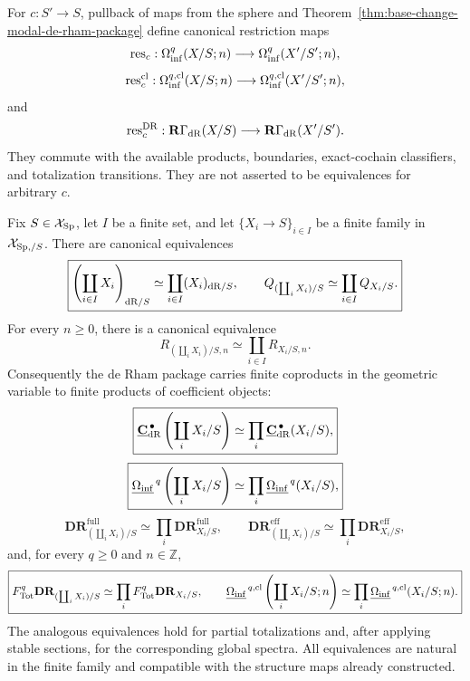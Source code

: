 \begin{construction}
\label{constr:global-form-base-change-restriction}
For \(c:S'\to S\), pullback of maps from the sphere and
Theorem~\ref{thm:base-change-modal-de-rham-package} define canonical restriction maps
\[
    \operatorname{res}_c:
    \Omega_{\mathrm{inf}}^q(X/S;n)
    \longrightarrow
    \Omega_{\mathrm{inf}}^q(X'/S';n),
\]
\[
    \operatorname{res}_c^{\mathrm{cl}}:
    \Omega_{\mathrm{inf}}^{q,\mathrm{cl}}(X/S;n)
    \longrightarrow
    \Omega_{\mathrm{inf}}^{q,\mathrm{cl}}(X'/S';n),
\]
and
\[
    \operatorname{res}_c^{\operatorname{DR}}:
    \mathbf R\Gamma_{\mathrm{dR}}(X/S)
    \longrightarrow
    \mathbf R\Gamma_{\mathrm{dR}}(X'/S').
\]
They commute with the available products, boundaries, exact-cochain classifiers, and totalization transitions.  They are not
asserted to be equivalences for arbitrary \(c\).
\end{construction}

\begin{proposition}
\label{prop:monadic-de-rham-finite-coproducts}
Fix \(S\in\mathcal X_{\mathrm{Sp}}\), let \(I\) be a finite set, and let
\(\{X_i\to S\}_{i\in I}\) be a finite family in \(\mathcal X_{\mathrm{Sp},/S}\).  There are canonical
equivalences
\[
\boxed{
    \left(\coprod_{i\in I}X_i\right)_{\mathrm{dR}/S}
    \simeq
    \coprod_{i\in I}(X_i)_{\mathrm{dR}/S},
    \qquad
    Q_{(\coprod_iX_i)/S}
    \simeq
    \coprod_{i\in I}Q_{X_i/S}.
}
\]
For every \(n\geq0\), there is a canonical equivalence
\[
\boxed{
    R_{(\coprod_iX_i)/S,n}
    \simeq
    \coprod_{i\in I}R_{X_i/S,n}.
}
\]
Consequently the de Rham package carries finite coproducts in the geometric variable to finite
products of coefficient objects:
\[
\boxed{
    \underline{\mathbf C}_{\mathrm{dR}}^{\,\bullet}
    \left(\coprod_iX_i/S\right)
    \simeq
    \prod_i\underline{\mathbf C}_{\mathrm{dR}}^{\,\bullet}(X_i/S),
}
\]
\[
\boxed{
    \underline{\Omega_{\mathrm{inf}}}^{\,q}
    \left(\coprod_iX_i/S\right)
    \simeq
    \prod_i\underline{\Omega_{\mathrm{inf}}}^{\,q}(X_i/S),
}
\]
\[
\boxed{
    \mathbf{DR}^{\mathrm{full}}_{(\coprod_iX_i)/S}
    \simeq
    \prod_i\mathbf{DR}^{\mathrm{full}}_{X_i/S},
    \qquad
    \mathbf{DR}^{\mathrm{eff}}_{(\coprod_iX_i)/S}
    \simeq
    \prod_i\mathbf{DR}^{\mathrm{eff}}_{X_i/S},
}
\]
and, for every \(q\geq0\) and \(n\in\mathbb Z\),
\[
\boxed{
    F_{\mathrm{Tot}}^q\mathbf{DR}_{(\coprod_iX_i)/S}
    \simeq
    \prod_iF_{\mathrm{Tot}}^q\mathbf{DR}_{X_i/S},
    \qquad
    \underline{\Omega_{\mathrm{inf}}}^{\,q,\mathrm{cl}}
    \left(\coprod_iX_i/S;n\right)
    \simeq
    \prod_i\underline{\Omega_{\mathrm{inf}}}^{\,q,\mathrm{cl}}(X_i/S;n).
}
\]
The analogous equivalences hold for partial totalizations and, after applying stable sections, for
the corresponding global spectra.  All equivalences are natural in the finite family and compatible
with the structure maps already constructed.
\end{proposition}

